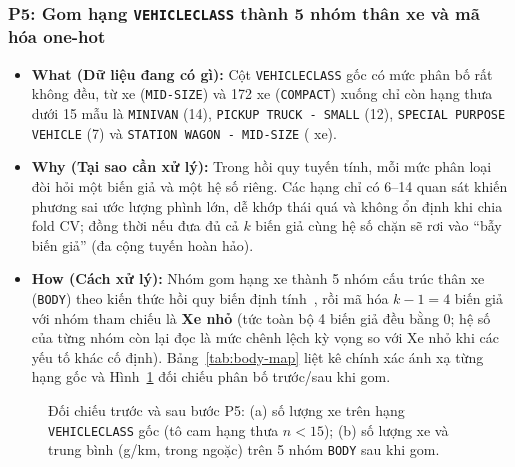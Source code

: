 \subsubsection{P5: Gom \nVehicleClasses{} hạng \texttt{VEHICLECLASS} thành 5 nhóm thân xe và mã hóa one-hot}
\begin{itemize}
  \item \textbf{What (Dữ liệu đang có gì):} Cột \texttt{VEHICLECLASS} gốc có \nVehicleClasses{} mức phân bố rất không đều, từ \maxClassCount{} xe (\texttt{MID-SIZE}) và 172 xe (\texttt{COMPACT}) xuống chỉ còn \nSparseClasses{} hạng thưa dưới 15 mẫu là \texttt{MINIVAN} (14), \texttt{PICKUP TRUCK - SMALL} (12), \texttt{SPECIAL PURPOSE VEHICLE} (7) và \texttt{STATION WAGON - MID-SIZE} (\minClassCount{} xe).
  \item \textbf{Why (Tại sao cần xử lý):} Trong hồi quy tuyến tính, mỗi mức phân loại đòi hỏi một biến giả và một hệ số riêng. Các hạng chỉ có 6--14 quan sát khiến phương sai ước lượng phình lớn, dễ khớp thái quá và không ổn định khi chia fold CV; đồng thời nếu đưa đủ cả $k$ biến giả cùng hệ số chặn sẽ rơi vào ``bẫy biến giả'' (đa cộng tuyến hoàn hảo).
  \item \textbf{How (Cách xử lý):} Nhóm gom \nVehicleClasses{} hạng xe thành 5 nhóm cấu trúc thân xe (\texttt{BODY}) theo kiến thức hồi quy biến định tính~\cite[Mục~8.6.1]{len2023phantichdulieu}, rồi mã hóa $k - 1 = 4$ biến giả với nhóm tham chiếu là \textbf{Xe nhỏ} (tức toàn bộ 4 biến giả đều bằng 0; hệ số của từng nhóm còn lại đọc là mức chênh lệch \COtwo{} kỳ vọng so với Xe nhỏ khi các yếu tố khác cố định). Bảng~\ref{tab:body-map} liệt kê chính xác ánh xạ từng hạng gốc và Hình~\ref{fig:body-group} đối chiếu phân bố trước/sau khi gom.
\end{itemize}

\begin{table}[htbp]
  \centering
  \caption{Ánh xạ chi tiết \nVehicleClasses{} hạng \texttt{VEHICLECLASS} gốc sang 5 nhóm thân xe \texttt{BODY} (bước P5).}
  \label{tab:body-map}
  \footnotesize
  
\end{table}

\begin{figure}[htbp]
  \centering
  
  \caption{Đối chiếu trước và sau bước P5: (a) số lượng xe trên \nVehicleClasses{} hạng \texttt{VEHICLECLASS} gốc (tô cam \nSparseClasses{} hạng thưa $n < 15$); (b) số lượng xe và \COtwo{} trung bình (g/km, trong ngoặc) trên 5 nhóm \texttt{BODY} sau khi gom.}
  \label{fig:body-group}
\end{figure}

